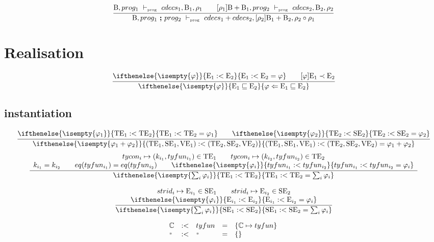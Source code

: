 \documentclass[11pt,a4paper]{article}
\newcommand{\key}[1]{\textrm{\textbf{#1}}}
\newcommand{\B}  {\textrm{B}}
\newcommand{\E}  {\textrm{E}}
\newcommand{\TE} {\textrm{TE}}
\newcommand{\VE} {\textrm{VE}}
\newcommand{\SE} {\textrm{SE}}
\newcommand{\tycon}{\mathbb{C}}
\newcommand{\vdashProg}	   {\ \vdash_{\textrm{\tiny prog}}\ }
\newcommand{\braced}[1]{\{#1\}}
\newcommand{\matchEnv}[3][]{ \ifthenelse{\isempty{#1}}{#2 \sqsubseteq #3}{#1 \Leftarrow #2 \sqsubseteq #3}}
\newcommand{\compose}[2]{#1 \circ #2}
\newcommand{\wildcard}{{\color{gray}\scriptstyle\textbf{*}}}
\newcommand{\Empty}{\braced{}}
\begin{document}
\[
\cfrac
 {\B               , prog_1 \vdashProg cdecs_1,\B_1,\rho_1 \qquad
  [\rho_1]\B + \B_1, prog_2 \vdashProg cdecs_2,\B_2,\rho_2 }
 {\B, prog_1\ \key{;}\ prog_2 \vdashProg cdecs_1+cdecs_2,[\rho_2]\B_1 + \B_2, \compose{\rho_2}{\rho_1}}
\]

\section{Realisation}
\vspace{-25pt}
\begin{flushright}
\framebox{ $ \matchEnv[\varphi]{\E_1}{\E_2} $ }
\end{flushright}

\newcommand{\instEop} {:<}
\newcommand{\instE}  [3][]{\ifthenelse{\isempty{#1}}{#2 \instEop #3}{#2 \instEop #3 = #1}}
\newcommand{\enrichE}[2]{#1 \prec #2}
\[
\cfrac
 {\instE[\varphi]{\E_1}{\E_2} \qquad \enrichE{[\varphi]\E_1}{\E_2} }
 {\matchEnv[\varphi]{\E_1}{\E_2}}
\]
\subsection{instantiation}
\[
\cfrac
 {\instE[\varphi_1]{\TE_1}{\TE_2} \qquad \instE[\varphi_2]{\TE_2}{\SE_2}}
 {\instE[\varphi_1 + \varphi_2]{(\TE_1,\SE_1,\VE_1)}{(\TE_2,\SE_2,\VE_2)}}
\]
\[
\cfrac
 {\begin{array}{c}
  tycon_i \mapsto (k_{i_1}, tyfun_{i_1}) \in \TE_1 \qquad tycon_i \mapsto (k_{i_2}, tyfun_{i_2}) \in \TE_2 \\
  k_{i_1} = k_{i_2} \qquad eq(tyfun_{i_1}) = eq(tyfun_{i_2}) \qquad \instE[\varphi_i]{tyfun_{i_1}}{tyfun_{i_2}} \\
  \end{array}}
 {\instE[\sum_i\varphi_i]{\TE_1}{\TE_2}}
\]

\[
\cfrac
 {\begin{array}{c}
  strid_i \mapsto \E_{i_1} \in \SE_1 \qquad strid_i \mapsto \E_{i_2} \in \SE_2 \\
  \instE[\varphi_i]{\E_{i_1}}{\E_{i_2}}
  \end{array}}
 {\instE[\sum_i\varphi_i]{\SE_1}{\SE_2}}
\]

\[
\begin{array}{lclcl}
{\tycon}    & \instEop & {tyfun}     & = & \braced{\tycon \mapsto tyfun} \\
{\wildcard} & \instEop & {\wildcard} & = & \Empty \\
\end{array}
\]
\end{document}
